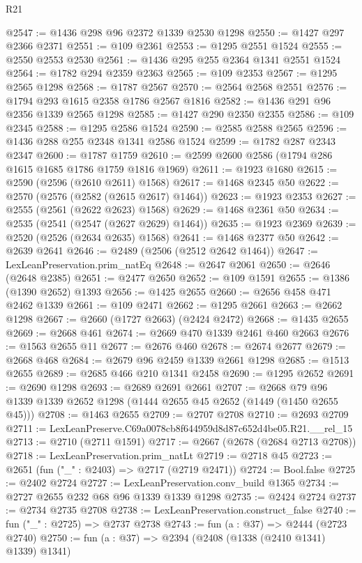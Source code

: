 \begin{lexlean}{R21}
\begin{coremodule}
@2547 := @1436 @298 @96 @2372 @1339 @2530 @1298
@2550 := @1427 @297 @2366 @2371
@2551 := @109 @2361
@2553 := @1295 @2551 @1524
@2555 := @2550 @2553 @2530
@2561 := @1436 @295 @255 @2364 @1341 @2551 @1524
@2564 := @1782 @294 @2359 @2363
@2565 := @109 @2353
@2567 := @1295 @2565 @1298
@2568 := @1787 @2567
@2570 := @2564 @2568 @2551
@2576 := @1794 @293 @1615 @2358 @1786 @2567 @1816
@2582 := @1436 @291 @96 @2356 @1339 @2565 @1298
@2585 := @1427 @290 @2350 @2355
@2586 := @109 @2345
@2588 := @1295 @2586 @1524
@2590 := @2585 @2588 @2565
@2596 := @1436 @288 @255 @2348 @1341 @2586 @1524
@2599 := @1782 @287 @2343 @2347
@2600 := @1787 @1759
@2610 := @2599 @2600 @2586 (@1794 @286 @1615 @1685 @1786 @1759 @1816 @1969)
@2611 := @1923 @1680
@2615 := @2590 (@2596 (@2610 @2611) @1568)
@2617 := @1468 @2345 @50
@2622 := @2570 (@2576 (@2582 (@2615 @2617) @1464))
@2623 := @1923 @2353
@2627 := @2555 (@2561 (@2622 @2623) @1568)
@2629 := @1468 @2361 @50
@2634 := @2535 (@2541 (@2547 (@2627 @2629) @1464))
@2635 := @1923 @2369
@2639 := @2520 (@2526 (@2634 @2635) @1568)
@2641 := @1468 @2377 @50
@2642 := @2639 @2641
@2646 := @2489 (@2506 (@2512 @2642 @1464))
@2647 := LexLeanPreservation.prim_natEq
@2648 := @2647 @2061
@2650 := @2646 (@2648 @2385)
@2651 := @2477 @2650
@2652 := @109 @1591
@2655 := @1386 (@1390 @2652) @1393
@2656 := @1425 @2655
@2660 := @2656 @458 @471 @2462 @1339
@2661 := @109 @2471
@2662 := @1295 @2661
@2663 := @2662 @1298
@2667 := @2660 (@1727 @2663) (@2424 @2472)
@2668 := @1435 @2655
@2669 := @2668 @461
@2674 := @2669 @470 @1339 @2461 @460 @2663
@2676 := @1563 @2655 @11
@2677 := @2676 @460
@2678 := @2674 @2677
@2679 := @2668 @468
@2684 := @2679 @96 @2459 @1339 @2661 @1298
@2685 := @1513 @2655
@2689 := @2685 @466 @210 @1341 @2458
@2690 := @1295 @2652
@2691 := @2690 @1298
@2693 := @2689 @2691 @2661
@2707 := @2668 @79 @96 @1339 @1339 @2652 @1298 (@1444 @2655 @45 @2652 (@1449 (@1450 @2655 @45)))
@2708 := @1463 @2655
@2709 := @2707 @2708
@2710 := @2693 @2709
@2711 := LexLeanPreserve.C69a0078cb8f644959d8d87c652d4be05.R21.__rel_15
@2713 := @2710 (@2711 @1591)
@2717 := @2667 (@2678 (@2684 @2713 @2708))
@2718 := LexLeanPreservation.prim_natLt
@2719 := @2718 @45
@2723 := @2651 (fun ("_" : @2403) => @2717 (@2719 @2471))
@2724 := Bool.false
@2725 := @2402 @2724
@2727 := LexLeanPreservation.conv_build @1365
@2734 := @2727 @2655 @232 @68 @96 @1339 @1339 @1298
@2735 := @2424 @2724
@2737 := @2734 @2735 @2708
@2738 := LexLeanPreservation.construct_false
@2740 := fun ("_" : @2725) => @2737 @2738
@2743 := fun (a : @37) => @2444 (@2723 @2740)
@2750 := fun (a : @37) => @2394 (@2408 (@1338 (@2410 @1341) @1339) @1341)

\end{coremodule}
\end{lexlean}
